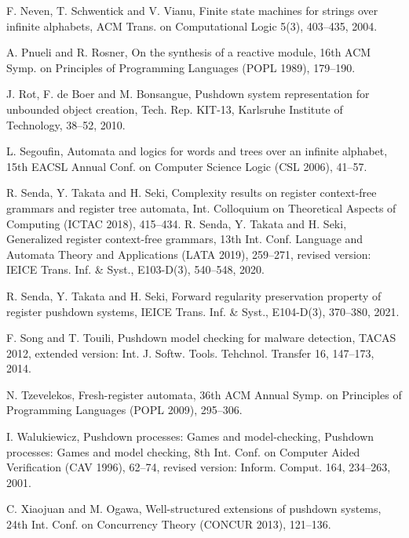\begin{thebibliography}{99}
F. Neven, T. Schwentick and V. Vianu,
Finite state machines for strings over infinite alphabets,
ACM Trans. on Computational Logic 5(3), 403--435, 2004.

 A. Pnueli and R. Rosner, On the synthesis of a reactive module,
16th ACM Symp. on Principles of Programming Languages (POPL 1989), 179--190.

J. Rot, F. de Boer and M. Bonsangue,
Pushdown system representation for unbounded object creation,
Tech. Rep. KIT-13, Karlsruhe Institute of Technology, 38--52, 2010.

L. Segoufin,
Automata and logics for words and trees over an infinite alphabet,
15th EACSL Annual Conf. on Computer Science Logic (CSL 2006), 41--57.

 R. Senda, Y. Takata and H. Seki,
Complexity results on register context-free grammars and register tree automata,
Int. Colloquium on Theoretical Aspects of Computing (ICTAC 2018),
415--434.
%
 R. Senda, Y. Takata and H. Seki,
Generalized register context-free grammars,
13th Int. Conf. Language and Automata Theory and Applications (LATA 2019), 259--271,
revised version: IEICE Trans. Inf. \& Syst., E103-D(3), 540--548, 2020.

 R. Senda, Y. Takata and H. Seki,
Forward regularity preservation property of register pushdown systems,
IEICE Trans. Inf. \& Syst., E104-D(3), 370--380, 2021.

F. Song and T. Touili, Pushdown model checking for malware detection,
TACAS 2012, extended version:
Int. J. Softw. Tools. Tehchnol. Transfer 16, 147--173, 2014.

 N. Tzevelekos, Fresh-register automata,
36th ACM Annual Symp. on Principles of Programming Languages (POPL 2009), 295--306.

 I. Walukiewicz, Pushdown processes: Games and model-checking,
Pushdown processes: Games and model checking,
8th Int. Conf. on Computer Aided Verification (CAV 1996),
62--74, revised version:
Inform. Comput. 164, 234--263, 2001.

C. Xiaojuan and M. Ogawa,
Well-structured extensions of pushdown systems,
24th Int. Conf. on Concurrency Theory (CONCUR 2013),
121--136.


\end{thebibliography}
